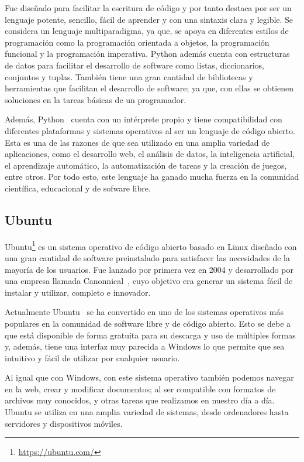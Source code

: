 \documentclass[a4paper, 12pt]{book}
\begin{document}
Fue diseñado para facilitar la escritura de código y por tanto destaca por ser un lenguaje potente, sencillo, fácil de aprender y con una sintaxis clara y legible.
Se considera un lenguaje multiparadigma, ya que, se apoya en diferentes estilos de programación como la programación orientada a objetos, la programación funcional y la programación imperativa.   
Python además cuenta con estructuras de datos para facilitar el desarrollo de software como listas, diccionarios, conjuntos y tuplas.
También tiene una gran cantidad de bibliotecas y herramientas que facilitan el desarrollo de software; ya que, con ellas se obtienen soluciones en la tareas básicas de un programador.


Además, Python~\cite{rios2016evaluacion} cuenta con un intérprete propio y tiene compatibilidad con diferentes plataformas y sistemas operativos al ser un lenguaje de código abierto.
Esta es una de las razones de que sea utilizado en una amplia variedad de aplicaciones, como el desarrollo web, el análisis de datos, la inteligencia artificial, el aprendizaje automático, la automatización de tareas y la creación de juegos, entre otros.
Por todo esto, este lenguaje ha ganado mucha fuerza en la comunidad científica, educacional y de sofware libre.


\subsection{Ubuntu} %
\label{sec:ubuntu} %

Ubuntu\footnote{\url{https://ubuntu.com/}} es un sistema operativo de código abierto basado en Linux diseñado con una gran cantidad de software preinstalado para satisfacer las necesidades de la mayoría de los usuarios.
Fue lanzado por primera vez en 2004 y desarrollado por una empresa llamada Canonnical~\cite{martinez2006software}, cuyo objetivo era generar un sistema fácil de instalar y utilizar, completo e innovador. 


Actualmente Ubuntu~\cite{tavera2013software} se ha convertido en uno de los sistemas operativos más populares en la comunidad de software libre y de código abierto.
Esto se debe a que está disponible de forma gratuita para su descarga y uso de múltiples formas y, además, tiene una interfaz muy parecida a Windows lo que permite que sea intuitivo y fácil de utilizar por cualquier usuario.


Al igual que con Windows, con este sistema operativo también podemos navegar en la web, crear y modificar documentos; al ser compatible con formatos de archivos muy conocidos, y otras tareas que realizamos en nuestro día a día. 
Ubuntu se utiliza en una amplia variedad de sistemas, desde ordenadores hasta servidores y dispositivos móviles. 
\end{document}

